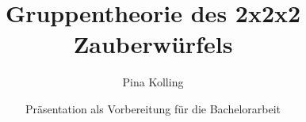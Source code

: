 \documentclass[11pt]{beamer}
\title[Gruppentheorie des 2x2x2 Zauberwürfels und dessen Lösungsalgorithmen \ \ \ \ \ \ \ \ \ \ \ \ \ \ \ \ \ \ \ \ \ \ \ \ \ \ \ \ \ \ \ \ \ \ \ \ \ \ \ \ \ \ \  WiSe2021] %
{Gruppentheorie des 2x2x2 Zauberwürfels}
\author {Pina Kolling}
\date[WiSe2021] %
{Präsentation als Vorbereitung für die Bachelorarbeit}
\begin{document}
\begin{frame}
	\titlepage
\end{frame}
\end{document}
